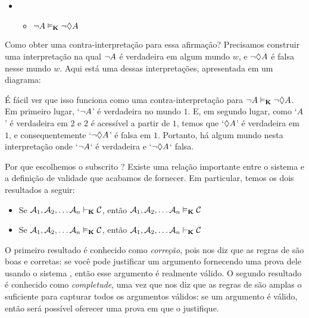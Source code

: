 \begin{itemize}
	\item[]
	      \begin{itemize}
		      \item[]$\neg A\vDash_{\mathbf{K}} \neg \Diamond A$
	      \end{itemize}
\end{itemize}
Como obter uma contra-interpretação para essa afirmação? Precisamos construir uma interpretação na qual $\neg A$ é verdadeira em algum mundo $w$, e $\neg\Diamond A$ é falsa   nesse mundo $w$. Aqui está uma dessas interpretações, apresentada em um diagrama:
\begin{center}
\end{center}
É fácil ver que isso funciona como uma contra-interpretação para  $\neg A\vDash_{\mathbf{K}}\neg\Diamond A$. Em primeiro lugar, `$\neg A$' é verdadeira no mundo $1$. 
E, em segundo lugar, como `$A$' é verdadeira em $2$ e $2$ é acessível a partir de $1$, temos que `$\Diamond A$' é verdadeira em $1$, e consequentemente `$\neg\Diamond A$'   é falsa em $1$. 
Portanto, há algum mundo nesta interpretação onde `$\neg A$` é verdadeira e `$\neg\Diamond A$`  falsa.  

Por que escolhemos o subscrito \mlK? Existe uma relação importante entre o sistema \mlK{} e a definição de validade que acabamos de fornecer. Em particular, temos os dois resultados a seguir:
\begin{itemize}
	\item Se $\mathcal{A}_1,\mathcal{A}_2, \dots \mathcal{A}_n\vdash_{\mathbf{K}}\mathcal{C}$, então $\mathcal{A}_1,\mathcal{A}_2, \dots \mathcal{A}_n\vDash_{\mathbf{K}}\mathcal{C}$
	\item Se $\mathcal{A}_1,\mathcal{A}_2, \dots \mathcal{A}_n\vDash_{\mathbf{K}}\mathcal{C}$, então $\mathcal{A}_1,\mathcal{A}_2, \dots \mathcal{A}_n\vdash_{\mathbf{K}}\mathcal{C}$
\end{itemize}
O primeiro resultado é conhecido como \emph{correção}, pois nos diz que as regras de \mlK{} são boas e corretas: se você pode justificar um argumento fornecendo uma prova dele usando o sistema \mlK, então esse argumento é realmente válido. O segundo resultado é conhecido como    \emph{completude}, uma vez que nos diz que as regras de \mlK{} são amplas o suficiente para capturar todos os argumentos válidos: se um argumento é válido, então será possível oferecer uma prova em \mlK{} que o justifique.
 

